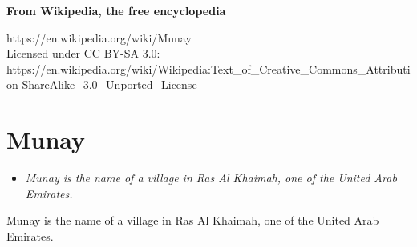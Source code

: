 \textbf{From Wikipedia, the free encyclopedia}

https://en.wikipedia.org/wiki/Munay\\
Licensed under CC BY-SA 3.0:\\
https://en.wikipedia.org/wiki/Wikipedia:Text\_of\_Creative\_Commons\_Attribution-ShareAlike\_3.0\_Unported\_License

\section{Munay}\label{munay}

\begin{itemize}
\item
  \emph{Munay is the name of a village in Ras Al Khaimah, one of the
  United Arab Emirates.}
\end{itemize}

Munay is the name of a village in Ras Al Khaimah, one of the United Arab
Emirates.
